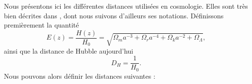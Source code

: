 \documentclass[11pt, twoside, a4paper, openright]{report}
\begin{document}
Nous présentons ici les différentes distances utilisées en cosmologie. Elles sont très bien décrites dans \cite{CITE: Hogg 1999}, dont nous suivons d'ailleurs ses notations. Définissons premièrement la quantité
\begin{equation}
  \label{eq:dist_ez}
  E(z) = \frac{H(z)}{H_0} 
  = \sqrt{\Omega_m a^{-3} + \Omega_r a^{-4} + \Omega_k a^{-2} + \Omega_{\Lambda}} ,
\end{equation}
ainsi que la distance de Hubble aujourd'hui
\begin{equation}
  \label{eq:dist_hubble}
  D_H = \frac{1}{H_0} .
\end{equation}
Nous pouvons alors définir les distances suivantes :
\end{document}

